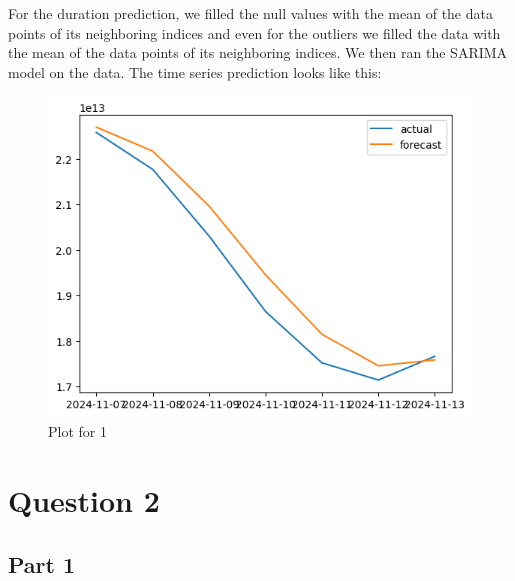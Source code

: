 \documentclass{article}
\begin{document}
For the duration prediction, we filled the null values with the mean of the data points of its neighboring indices and even for the outliers we filled the data with the mean of the data points of its neighboring indices. We then ran the SARIMA model on the data. The time series prediction looks like this:

\begin{figure}[H]
\centering
\includegraphics[width=\textwidth]{1c_image_2.png}
\caption{Plot for 1}
\end{figure}


\section{Question 2}
\subsection{Part 1}
\end{document}

